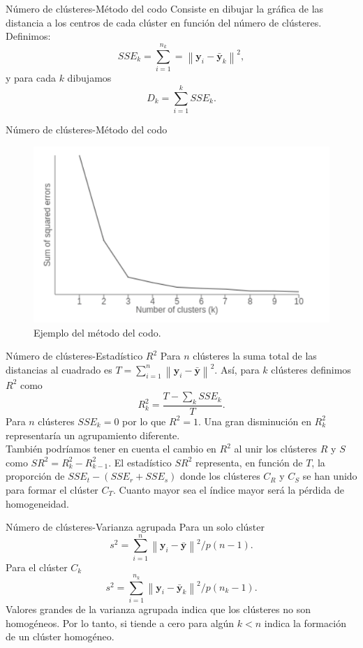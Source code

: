 \documentclass[spanish]{beamer}
\newcommand{\norm}[1]{\left\lVert#1\right\rVert}
\newcommand{\yy}{\textbf{y}}
\begin{document}
\begin{frame}{Número de clústeres-Método del codo}
	Consiste en dibujar la gráfica de las distancia a los centros de cada clúster en función del número de clústeres. Definimos:
	\[
	SSE_k = \sum_{i = 1}^{n_k} = \norm{\yy_i - \bar{\yy}_k}^2,
	\]
	y para cada $ k $ dibujamos
	\[
	D_k = \sum_{i = 1} ^ {k} SSE_k.
	\]
\end{frame}

\begin{frame}{Número de clústeres-Método del codo}
	\begin{figure}[h]
		\centering
		\includegraphics[scale=0.5]{pedro/elbowGraph}
		\caption{Ejemplo del método del codo.}
		\label{smkm}
	\end{figure}
\end{frame}

\begin{frame}{Número de clústeres-Estadístico $ R^2 $}
	Para $ n $ clústeres la suma total de las distancias al cuadrado es $ T = \sum_{i = 1}^{n} \norm{\yy_i - \bar{\yy}}^2 $. Así, para $ k $ clústeres definimos $ R^2 $ como
	\[
	R^{2}_{k} = \frac{T - \sum_k SSE_k}{T}.
	\]
	Para $ n $ clústeres $ SSE_k = 0 $ por lo que $ R^2 = 1 $. Una gran disminución en $ R^2_k $ representaría un agrupamiento diferente. \\
	También podríamos tener en cuenta el cambio en $ R^2 $ al unir los clústeres $ R $ y $ S $ como $ SR^2 = R_k^2 - R^2_{k-1} $. El estadístico $ SR^2 $ representa, en función de $ T $, la proporción de $ SSE_t - (SSE_r + SSE_s) $ donde los clústeres $ C_R $ y $ C_S $ se han unido para formar el clúster $ C_T $.  Cuanto mayor sea el índice mayor será la pérdida de homogeneidad.
\end{frame}

\begin{frame}{Número de clústeres-Varianza agrupada}
	Para un solo clúster \[ s^2 = \sum_{i=1}^{n} \norm{\yy_i - \bar{\yy}}^2/ p(n-1).\]
	Para el clúster $ C_k $
	\[
	s^2 = \sum_{i=1}^{n_k} \norm{\yy_i - \bar{\yy}_k}^2/ p(n_k-1).
	\]
	Valores grandes de la varianza agrupada indica que los clústeres no son homogéneos. Por lo tanto, si tiende a cero para algún $  k < n $ indica la formación de un clúster homogéneo.
\end{frame}
\end{document}
